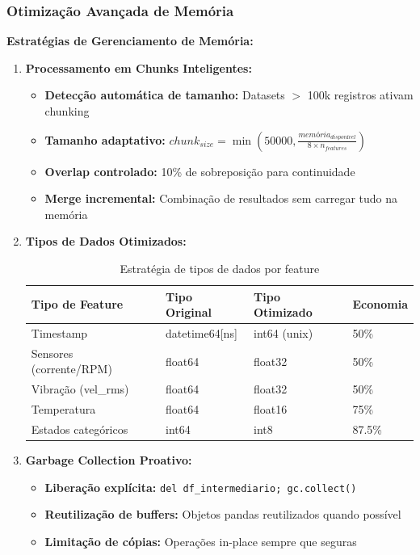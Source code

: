 \subsubsection{Otimização Avançada de Memória}

\textbf{Estratégias de Gerenciamento de Memória:}

\begin{enumerate}
    \item \textbf{Processamento em Chunks Inteligentes:}
    \begin{itemize}
        \item \textbf{Detecção automática de tamanho:} Datasets $>$ 100k registros ativam chunking
        \item \textbf{Tamanho adaptativo:} $chunk_{size} = \min(50000, \frac{memória_{disponível}}{8 \times n_{features}})$
        \item \textbf{Overlap controlado:} 10\% de sobreposição para continuidade
        \item \textbf{Merge incremental:} Combinação de resultados sem carregar tudo na memória
    \end{itemize}

    \item \textbf{Tipos de Dados Otimizados:}
    \begin{table}[H]
    \centering
    \caption{Estratégia de tipos de dados por feature}
    \begin{tabular}{|l|l|l|l|}
    \hline
    \textbf{Tipo de Feature} & \textbf{Tipo Original} & \textbf{Tipo Otimizado} & \textbf{Economia} \\
    \hline
    Timestamp & datetime64[ns] & int64 (unix) & 50\% \\
    Sensores (corrente/RPM) & float64 & float32 & 50\% \\
    Vibração (vel\_rms) & float64 & float32 & 50\% \\
    Temperatura & float64 & float16 & 75\% \\
    Estados categóricos & int64 & int8 & 87.5\% \\
    \hline
    \end{tabular}
    \end{table}

    \item \textbf{Garbage Collection Proativo:}
    \begin{itemize}
        \item \textbf{Liberação explícita:} \texttt{del df\_intermediario; gc.collect()}
        \item \textbf{Reutilização de buffers:} Objetos pandas reutilizados quando possível
        \item \textbf{Limitação de cópias:} Operações in-place sempre que seguras
    \end{itemize}


\end{enumerate}
